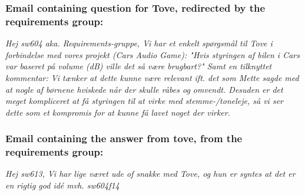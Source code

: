 \subsubsection*{Email containing question for Tove, redirected by the requirements group:}\label{email_volume}
\textit{Hej sw604 aka. Requirements-gruppe,
Vi har et enkelt spørgsmål til Tove i forbindelse med vores projekt (Cars Audio Game):
"Hvis styringen af bilen i Cars var baseret på volume (dB) ville det så være brugbart?"
Samt en tilknyttet kommentar:
Vi tænker at dette kunne være relevant ift. det som Mette sagde med at nogle af børnene hviskede når der skulle råbes og omvendt.
Desuden er det meget kompliceret at få styringen til at virke med stemme-/toneleje, så vi ser dette som et kompromis for at kunne få lavet noget der virker.}

\subsubsection*{Email containing the answer from tove, from the requirements group:}
\textit{
Hej sw613,
Vi har lige været ude of snakke med Tove, og hun er syntes at det er en rigtig god idé
mvh.
sw604f14}